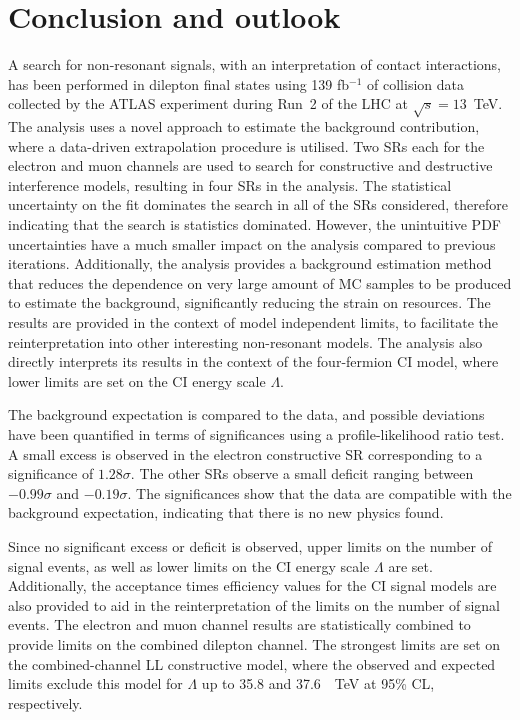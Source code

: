\chapter{Conclusion and outlook}\label{chap:conclusion}

A search for non-resonant signals, with an interpretation of contact interactions, has been performed in dilepton final states using 139 fb$^{-1}$ of \protonproton collision data collected by the ATLAS experiment during Run~2 of the LHC at $\sqrt{s}=13$~TeV. The analysis uses a novel approach to estimate the background contribution, where a data-driven extrapolation procedure is utilised. Two SRs each for the electron and muon channels are used to search for constructive and destructive interference models, resulting in four SRs in the analysis. The statistical uncertainty on the fit dominates the search in all of the SRs considered, therefore indicating that the search is statistics dominated. However, the unintuitive PDF uncertainties have a much smaller impact on the analysis compared to previous iterations. Additionally, the analysis provides a background estimation method that reduces the dependence on very large amount of MC samples to be produced to estimate the background, significantly reducing the strain on resources. The results are provided in the context of model independent limits, to facilitate the reinterpretation into other interesting non-resonant models. The analysis also directly interprets its results in the context of the four-fermion CI model, where lower limits are set on the CI energy scale $\Lambda$. 

The background expectation is compared to the data, and possible deviations have been quantified in terms of significances using a profile-likelihood ratio test. A small excess is observed in the electron constructive SR corresponding to a significance of $1.28\sigma$. The other SRs observe a small deficit ranging between $-0.99\sigma$ and $ -0.19\sigma$. The significances show that the data are compatible with the background expectation, indicating that there is no new physics found. 

Since no significant excess or deficit is observed, upper limits on the number of signal events, as well as lower limits on the CI energy scale $\Lambda$ are set. Additionally, the acceptance times efficiency values for the CI signal models are also provided to aid in the reinterpretation of the limits on the number of signal events. The electron and muon channel results are statistically combined to provide limits on the combined dilepton channel. The strongest limits are set on the combined-channel LL constructive model, where the observed and expected limits exclude this model for $\Lambda$ up to 35.8 and 37.6~\SI{}{\tera\electronvolt} at 95\% CL, respectively. 

